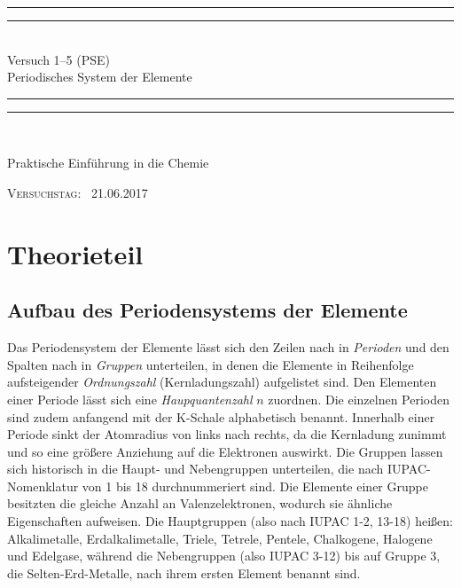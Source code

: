 \documentclass{scrartcl}
\newlength{\drop}
\begin{document}
  \begin{titlepage}
    \textheight
    \centering
    \vspace*{\baselineskip}
    \rule{\textwidth}{1.6pt}\vspace*{-\baselineskip}\vspace*{2pt}
    \rule{\textwidth}{0.4pt}\\[\baselineskip]
    {\LARGE Versuch 1--5 (PSE)\\[0.3\baselineskip] Periodisches System der Elemente}\\[0.2\baselineskip]
    \rule{\textwidth}{0.4pt}\vspace*{-\baselineskip}\vspace{3.2pt}
    \rule{\textwidth}{1.6pt}\\[\baselineskip]
    \scshape
    {Praktische Einführung in die Chemie\par}
    \vspace*{2\baselineskip}
    \vfill
    {\scshape Versuchstag:} \        {\large 21.06.2017}\par
  \end{titlepage}
\section{Theorieteil}
\subsection{Aufbau des Periodensystems der Elemente}
Das Periodensystem der Elemente lässt sich den Zeilen nach in \emph{Perioden} und den Spalten nach in \emph{Gruppen} unterteilen, in denen die Elemente in Reihenfolge aufsteigender \emph{Ordnungszahl} (Kernladungszahl) aufgelistet sind. Den Elementen einer Periode lässt sich eine \emph{Haupquantenzahl} $n$ zuordnen. Die einzelnen Perioden sind zudem anfangend mit der K-Schale alphabetisch benannt. Innerhalb einer Periode sinkt der Atomradius von links nach rechts, da die Kernladung zunimmt und so eine größere Anziehung auf die Elektronen auswirkt. Die Gruppen lassen sich historisch in die Haupt- und Nebengruppen unterteilen, die nach IUPAC-Nomenklatur von 1 bis 18 durchnummeriert sind. Die Elemente einer Gruppe besitzten die gleiche Anzahl an Valenzelektronen, wodurch sie ähnliche Eigenschaften aufweisen. Die Hauptgruppen (also nach IUPAC 1-2, 13-18) heißen: Alkalimetalle, Erdalkalimetalle, Triele, Tetrele, Pentele, Chalkogene, Halogene und Edelgase, während die Nebengruppen (also IUPAC 3-12) bis auf Gruppe 3, die Selten-Erd-Metalle, nach ihrem ersten Element benannt sind.
\end{document}
